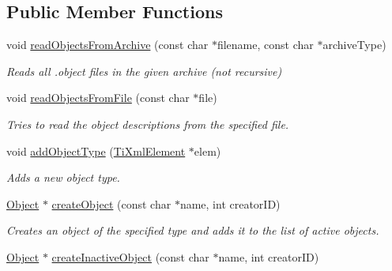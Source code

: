 \subsection*{\-Public \-Member \-Functions}
\begin{DoxyCompactItemize}
\item 
\hypertarget{classObjectManager_a752b7dfb106a187bdab922d468e0a11d}{
void \hyperlink{classObjectManager_a752b7dfb106a187bdab922d468e0a11d}{read\-Objects\-From\-Archive} (const char $\ast$filename, const char $\ast$archive\-Type)}
\label{d6/d6f/classObjectManager_a752b7dfb106a187bdab922d468e0a11d}

\begin{DoxyCompactList}\small\item\em \-Reads all .object files in the given archive (not recursive) \end{DoxyCompactList}\item 
\hypertarget{classObjectManager_a0c356c951d827bfa79ead0d7d338f39a}{
void \hyperlink{classObjectManager_a0c356c951d827bfa79ead0d7d338f39a}{read\-Objects\-From\-File} (const char $\ast$file)}
\label{d6/d6f/classObjectManager_a0c356c951d827bfa79ead0d7d338f39a}

\begin{DoxyCompactList}\small\item\em \-Tries to read the object descriptions from the specified file. \end{DoxyCompactList}\item 
\hypertarget{classObjectManager_aa3fe9dd66c7e4b287fc26feaf9268084}{
void \hyperlink{classObjectManager_aa3fe9dd66c7e4b287fc26feaf9268084}{add\-Object\-Type} (\hyperlink{classTiXmlElement}{\-Ti\-Xml\-Element} $\ast$elem)}
\label{d6/d6f/classObjectManager_aa3fe9dd66c7e4b287fc26feaf9268084}

\begin{DoxyCompactList}\small\item\em \-Adds a new object type. \end{DoxyCompactList}\item 
\hypertarget{classObjectManager_ad115ccf6634175927a7d2e45099664aa}{
\hyperlink{classObject}{\-Object} $\ast$ \hyperlink{classObjectManager_ad115ccf6634175927a7d2e45099664aa}{create\-Object} (const char $\ast$name, int creator\-I\-D)}
\label{d6/d6f/classObjectManager_ad115ccf6634175927a7d2e45099664aa}

\begin{DoxyCompactList}\small\item\em \-Creates an object of the specified type and adds it to the list of active objects. \end{DoxyCompactList}\item 
\hypertarget{classObjectManager_a5a7cbf68bdc8cb41546276bf8939913a}{
\hyperlink{classObject}{\-Object} $\ast$ \hyperlink{classObjectManager_a5a7cbf68bdc8cb41546276bf8939913a}{create\-Inactive\-Object} (const char $\ast$name, int creator\-I\-D)}
\label{d6/d6f/classObjectManager_a5a7cbf68bdc8cb41546276bf8939913a}


\end{DoxyCompactItemize}

